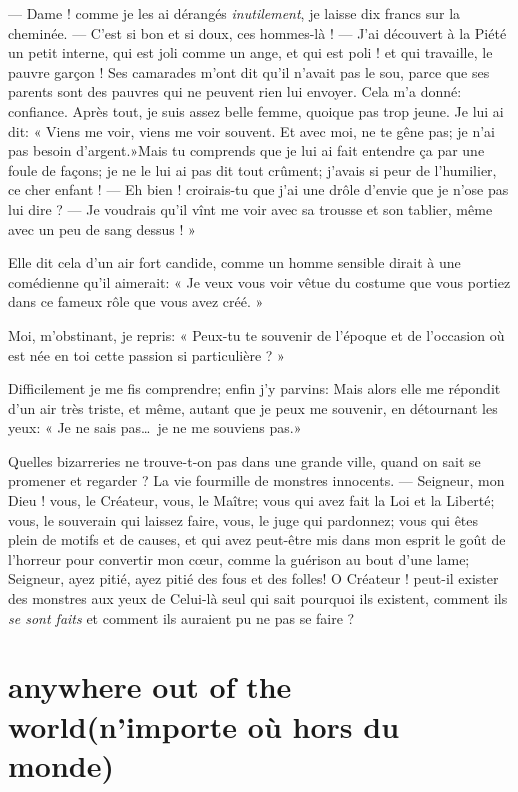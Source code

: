 --- Dame ! comme je les ai dérangés \textit{inutilement}, je laisse dix francs sur
la cheminée. --- C’est si bon et si doux, ces
hommes{}-là ! --- J’ai découvert à la Piété un petit
interne, qui est joli comme un ange, et qui est poli ! et qui
travaille, le pauvre garçon ! Ses camarades m’ont dit
qu’il n’avait pas le sou, parce que
ses parents sont des pauvres qui ne peuvent rien lui envoyer. Cela
m’a donné: confiance. Après tout, je suis assez belle
femme, quoique pas trop jeune. Je lui ai dit: « Viens me voir, viens me
voir souvent. Et avec moi, ne te gêne pas; je n’ai pas
besoin d’argent.»Mais tu comprends que je lui ai fait
entendre ça par une foule de façons; je ne le lui ai pas dit tout
crûment; j’avais si peur de
l’humilier, ce cher enfant ! --- Eh bien ! croirais{}-tu
que j’ai une drôle d’envie que je
n’ose pas lui dire ? --- Je voudrais
qu’il vînt me voir avec sa trousse et son tablier,
même avec un peu de sang dessus ! »

Elle dit cela d’un air fort candide, comme un homme
sensible dirait à une comédienne qu’il aimerait: « Je
veux vous voir vêtue du costume que vous portiez dans ce fameux rôle
que vous avez créé. »

Moi, m’obstinant, je repris: « Peux{}-tu te souvenir de
l’époque et de l’occasion où est née
en toi cette passion si particulière ? »

Difficilement je me fis comprendre; enfin j’y parvins:
Mais alors elle me répondit d’un air très triste, et
même, autant que je peux me souvenir, en détournant les yeux: « Je ne
sais pas\ldots\ je ne me souviens pas.»

Quelles bizarreries ne trouve{}-t{}-on pas dans une grande ville, quand
on sait se promener et regarder ? La vie fourmille de monstres
innocents. --- Seigneur, mon Dieu ! vous, le Créateur, vous, le Maître;
vous qui avez fait la Loi et la Liberté; vous, le souverain qui laissez
faire, vous, le juge qui pardonnez; vous qui êtes plein de motifs et de
causes, et qui avez peut{}-être mis dans mon esprit le goût de
l’horreur pour convertir mon c\oe ur, comme la guérison
au bout d’une lame; Seigneur, ayez pitié, ayez pitié
des fous et des folles! O Créateur ! peut{}-il exister des monstres aux
yeux de Celui{}-là seul qui sait pourquoi ils existent, comment ils \textit{se
sont faits} et comment ils auraient pu ne pas se faire ?

\quebra\section[Anywhere out of the world]{anywhere out of the world\break (n’importe où hors du monde)}

